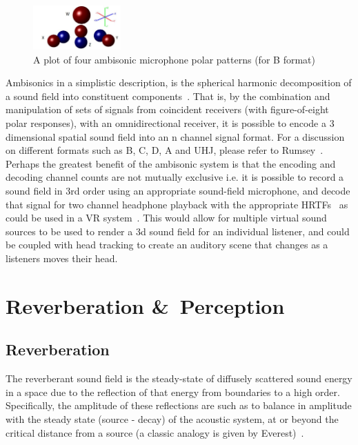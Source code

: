 \documentclass[paper=a4, fontsize=10pt, font=arial]{scrartcl} %
\numberwithin{equation}{section} %
\numberwithin{figure}{section} %
\numberwithin{table}{section} %
\begin{document}
\begin{figure}[H]
\centering
\includegraphics[width=0.3\textwidth]{ambisonicmicpatterns.jpg}
\centering
\caption{A plot of four ambisonic microphone polar patterns (for B format)~\cite{Wiggins2004}}
\end{figure}

Ambisonics in a simplistic description, is the spherical harmonic decomposition of a sound field into constituent components~\cite{rumsey2012spatial}. 
That is, by the combination and manipulation of  sets of signals from coincident receivers (with figure-of-eight polar responses), with an omnidirectional receiver, it is possible to encode a 3 dimensional spatial sound field into an n channel signal format. 
For a discussion on different formats such as B, C, D, A and UHJ, please refer to Rumsey~\cite{rumsey2012spatial}. 
Perhaps the greatest benefit of the ambisonic system is that the encoding and decoding channel counts are not mutually exclusive i.e. it is possible to record a sound field in 3rd order using an appropriate sound-field microphone, and decode that signal for two channel headphone playback with the appropriate HRTFs~\cite{Jot1998} as could be used in a VR system~\cite{Collins2013}. This would allow for multiple virtual sound sources to be used to render a 3d sound field for an individual listener, and could be coupled with head tracking to create an auditory scene that changes as a listeners moves their head.\


\newpage
\section{Reverberation \&\ Perception}
\subsection{Reverberation}

The reverberant sound field is the steady-state of diffusely scattered sound energy in a space due to the reflection of that energy from boundaries to a high order. 
Specifically, the amplitude of these reflections are such as to balance in amplitude with the steady state (source - decay) of the acoustic system, at or beyond the critical distance from a source (a classic analogy is given by Everest)~\cite{Everest2009}. 
\end{document}
